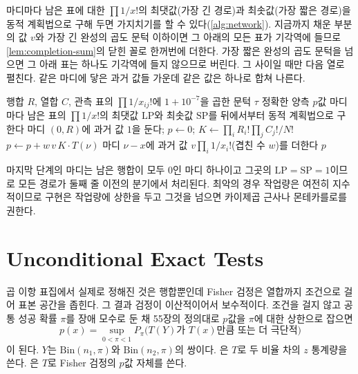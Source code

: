 마디마다 남은 표에 대한 $\prod1/x!$의 최댓값(가장 긴 경로)과 최솟값(가장 짧은 경로)을 동적 계획법으로 구해 두면 가지치기를 할 수 있다(\cref{alg:network}). 지금까지 채운 부분의 값 $v$와 가장 긴 완성의 곱도 문턱 이하이면 그 아래의 모든 표가 기각역에 들므로 \cref{lem:completion-sum}의 닫힌 꼴로 한꺼번에 더한다. 가장 짧은 완성의 곱도 문턱을 넘으면 그 아래 표는 하나도 기각역에 들지 않으므로 버린다. 그 사이일 때만 다음 열로 펼친다. 같은 마디에 닿은 과거 값들 가운데 같은 값은 하나로 합쳐 나른다.

\begin{algorithm}[t]
\begin{algorithmic}[1]
\Require 행합 $R$, 열합 $C$, 관측 표의 $\prod1/x_{ij}!$에 $1+10^{-7}$을 곱한 문턱 $\tau$
\Ensure 정확한 양측 $p$값
\State 마디마다 남은 표의 $\prod1/x!$의 최댓값 $\mathrm{LP}$와 최솟값 $\mathrm{SP}$를 뒤에서부터 동적 계획법으로 구한다
\State 마디 $(0,R)$에 과거 값 $1$을 둔다; $p\gets0$; $K\gets\prod_iR_i!\prod_jC_j!/N!$
     $p\gets p+w\,v\,K\cdot T(\nu)$ 
        \State 마디 $\nu-x$에 과거 값 $v\prod_i1/x_i!$(겹친 수 $w$)를 더한다
      \EndFor
    \EndIf
  \EndFor
\EndFor
\State \Return $p$
\end{algorithmic}
\caption{$r\times c$ Fisher 정확 검정의 망 알고리즘}
\label{alg:network}
\end{algorithm}

마지막 단계의 마디는 남은 행합이 모두 $0$인 마디 하나이고 그곳의 $\mathrm{LP}=\mathrm{SP}=1$이므로 모든 경로가 둘째 줄 이전의 분기에서 처리된다. 최악의 경우 작업량은 여전히 지수적이므로 구현은 작업량에 상한을 두고 그것을 넘으면 카이제곱 근사나 몬테카를로를 권한다.

\section{Unconditional Exact Tests}
\label{sec:unconditional}

곱 이항 표집에서 실제로 정해진 것은 행합뿐인데 Fisher 검정은 열합까지 조건으로 걸어 표본 공간을 좁힌다. 그 결과 검정이 이산적이어서 보수적이다. 조건을 걸지 않고 공통 성공 확률 $\pi$를 장애 모수로 둔 채 55장의 정의대로 $p$값을 $\pi$에 대한 상한으로 잡으면
\[
p(x)=\sup_{0<\pi<1}P_\pi\bigl(T(Y)\text{가 }T(x)\text{만큼 또는 더 극단적}\bigr)
\]
이 된다. $Y$는 $\mathrm{Bin}(n_1,\pi)$와 $\mathrm{Bin}(n_2,\pi)$의 쌍이다. 은 $T$로 두 비율 차의 $z$ 통계량을 쓴다\cite{barnard1945}. 은 $T$로 Fisher 검정의 $p$값 자체를 쓴다\cite{boschloo1970}.

